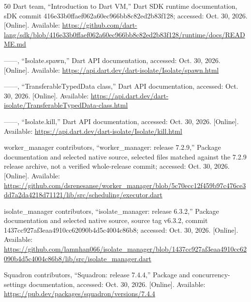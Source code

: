 \documentclass[14pt,a4paper,oneside]{extreport}
\begin{document}
\begin{thebibliography}{50}
\BIBentryALTinterwordspacing
{Dart team}, ``Introduction to {Dart VM},'' Dart SDK runtime documentation, sDK
  commit 416e33b0ffaef062a60ec966bb8c82ed2b83f128; accessed: Oct. 30, 2026.
  [Online]. Available:
  \url{https://github.com/dart-lang/sdk/blob/416e33b0ffaef062a60ec966bb8c82ed2b83f128/runtime/docs/README.md}
\BIBentrySTDinterwordspacing

\BIBentryALTinterwordspacing
------, ``{Isolate.spawn},'' Dart API documentation, accessed: Oct. 30, 2026.
  [Online]. Available:
  \url{https://api.dart.dev/dart-isolate/Isolate/spawn.html}
\BIBentrySTDinterwordspacing

\BIBentryALTinterwordspacing
------, ``{TransferableTypedData} class,'' Dart API documentation, accessed:
  Oct. 30, 2026. [Online]. Available:
  \url{https://api.dart.dev/dart-isolate/TransferableTypedData-class.html}
\BIBentrySTDinterwordspacing

\BIBentryALTinterwordspacing
------, ``{Isolate.kill},'' Dart API documentation, accessed: Oct. 30, 2026.
  [Online]. Available:
  \url{https://api.dart.dev/dart-isolate/Isolate/kill.html}
\BIBentrySTDinterwordspacing

\BIBentryALTinterwordspacing
{worker\_manager contributors}, ``{worker\_manager}: release 7.2.9,'' Package
  documentation and selected native source, selected files matched against the
  7.2.9 release archive, not a verified whole-release commit; accessed: Oct.
  30, 2026. [Online]. Available:
  \url{https://github.com/dsrenesanse/worker_manager/blob/5c70ecc12f459b97c476ce3dd7a2da4218d71121/lib/src/scheduling/executor.dart}
\BIBentrySTDinterwordspacing

\BIBentryALTinterwordspacing
{isolate\_manager contributors}, ``{isolate\_manager}: release 6.3.2,'' Package
  documentation and selected native source, source tag v6.3.2, commit
  1437cc927af3eaa4910cc62090b4d5c4004c86b8; accessed: Oct. 30, 2026. [Online].
  Available:
  \url{https://github.com/lamnhan066/isolate_manager/blob/1437cc927af3eaa4910cc62090b4d5c4004c86b8/lib/src/isolate_manager.dart}
\BIBentrySTDinterwordspacing

\BIBentryALTinterwordspacing
{Squadron contributors}, ``{Squadron}: release 7.4.4,'' Package and
  concurrency-settings documentation, accessed: Oct. 30, 2026. [Online].
  Available: \url{https://pub.dev/packages/squadron/versions/7.4.4}
\BIBentrySTDinterwordspacing


\end{thebibliography}
\end{document}
